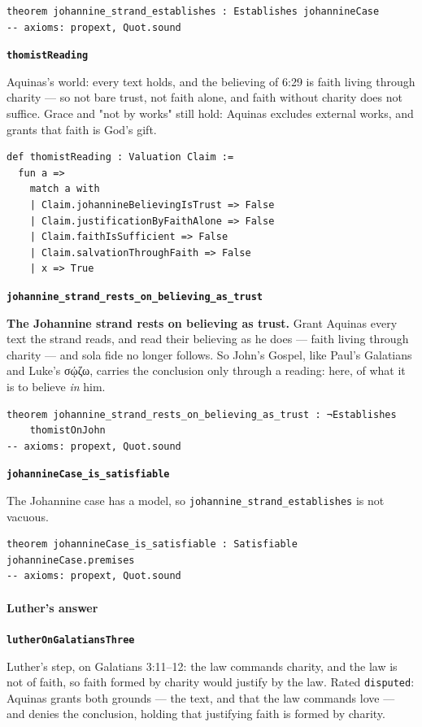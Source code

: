\documentclass[11pt]{article}
\begin{document}
{\small\begin{verbatim}
theorem johannine_strand_establishes : Establishes johannineCase
-- axioms: propext, Quot.sound
\end{verbatim}}
\par\medskip\noindent\textbf{\texttt{thomist\allowbreak{}Reading}}\par\nobreak\noindent
Aquinas's world: every text holds, and the believing of 6:29 is faith living through charity — so not bare trust, not faith alone, and faith without charity does not suffice. Grace and "not by works" still hold: Aquinas excludes external works, and grants that faith is God's gift.

{\small\begin{verbatim}
def thomistReading : Valuation Claim :=
  fun a =>
    match a with
    | Claim.johannineBelievingIsTrust => False
    | Claim.justificationByFaithAlone => False
    | Claim.faithIsSufficient => False
    | Claim.salvationThroughFaith => False
    | x => True
\end{verbatim}}
\par\medskip\noindent\textbf{\texttt{johannine\_\allowbreak{}strand\_\allowbreak{}rests\_\allowbreak{}on\_\allowbreak{}believing\_\allowbreak{}as\_\allowbreak{}trust}}\par\nobreak\noindent
\textbf{The Johannine strand rests on believing as trust.} Grant Aquinas every text the strand reads, and read their believing as he does — faith living through charity — and sola fide no longer follows. So John's Gospel, like Paul's Galatians and Luke's σῴζω, carries the conclusion only through a reading: here, of what it is to believe \emph{in} him.

{\small\begin{verbatim}
theorem johannine_strand_rests_on_believing_as_trust : ¬Establishes
    thomistOnJohn
-- axioms: propext, Quot.sound
\end{verbatim}}
\par\medskip\noindent\textbf{\texttt{johannine\allowbreak{}Case\_\allowbreak{}is\_\allowbreak{}satisfiable}}\par\nobreak\noindent
The Johannine case has a model, so \texttt{johannine\_\allowbreak{}strand\_\allowbreak{}establishes} is not vacuous.

{\small\begin{verbatim}
theorem johannineCase_is_satisfiable : Satisfiable johannineCase.premises
-- axioms: propext, Quot.sound
\end{verbatim}}
\paragraph*{Luther's answer}
\leavevmode\par
\par\medskip\noindent\textbf{\texttt{luther\allowbreak{}On\allowbreak{}Galatians\allowbreak{}Three}}\par\nobreak\noindent
Luther's step, on Galatians 3:11–12: the law commands charity, and the law is not of faith, so faith formed by charity would justify by the law. Rated \texttt{disputed}: Aquinas grants both grounds — the text, and that the law commands love — and denies the conclusion, holding that justifying faith is formed by charity.
\end{document}
